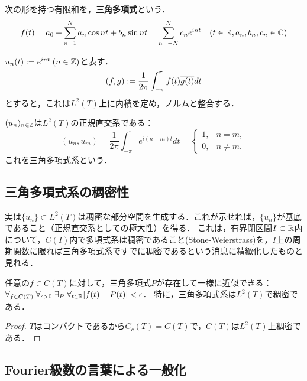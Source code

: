 \documentclass[uplatex,dvipdfmx]{jsreport}
\begin{document}
\begin{definition}
    次の形を持つ有限和を，\textbf{三角多項式}という．
    \[f(t)=a_0+\sum^N_{n=1}a_n\cos nt+b_n\sin nt=\sum^N_{n=-N}c_ne^{int}\quad(t\in\mathbb{R},a_n,b_n,c_n\in\mathbb{C})\]
\end{definition}

\begin{notation}
    $u_n(t):=e^{int}\;(n\in\mathbb{Z})$と表す．
    \[(f,g):=\frac{1}{2\pi}\int^\pi_{-\pi}f(t)\overline{g(t)}dt\]
    とすると，これは$L^2(T)$上に内積を定め，ノルムと整合する．
\end{notation}

\begin{lemma}
    $(u_n)_{n\in\mathbb{Z}}$は$L^2(T)$の正規直交系である：
    \[(u_n,u_m)=\frac{1}{2\pi}\int^\pi_{-\pi}e^{i(n-m)t}dt=\begin{cases}
        1,&n=m,\\
        0,&n\ne m.
    \end{cases}\]
    これを三角多項式系という．
\end{lemma}

\subsection{三角多項式系の稠密性}

\begin{tcolorbox}[colframe=ForestGreen, colback=ForestGreen!10!white,breakable,colbacktitle=ForestGreen!40!white,coltitle=black,fonttitle=\bfseries\sffamily,
title=]
    実は$\{u_n\}\subset L^2(T)$は稠密な部分空間を生成する．これが示せれば，$\{u_n\}$が基底であること（正規直交系としての極大性）を得る．
    これは，有界閉区間$I\subset\mathbb{R}$内について，$C(I)$内で多項式系は稠密であること(Stone-Weierstrass)を，$I$上の周期関数に限れば三角多項式系ですでに稠密であるという消息に精緻化したものと見れる．
\end{tcolorbox}

\begin{theorem}
    任意の$f\in C(T)$に対して，三角多項式$P$が存在して一様に近似できる：
    $\forall_{f\in C(T)}\;\forall_{\epsilon>0}\;\exists_{P}\;\forall_{t\in\mathbb{R}}\lvert f(t)-P(t)\rvert<\epsilon$．
    特に，三角多項式系は$L^2(T)$で稠密である．
\end{theorem}
\begin{proof}
    $T$はコンパクトであるから$C_c(T)=C(T)$で，$C(T)$は$L^2(T)$上稠密である．
\end{proof}

\subsection{Fourier級数の言葉による一般化}
\end{document}
